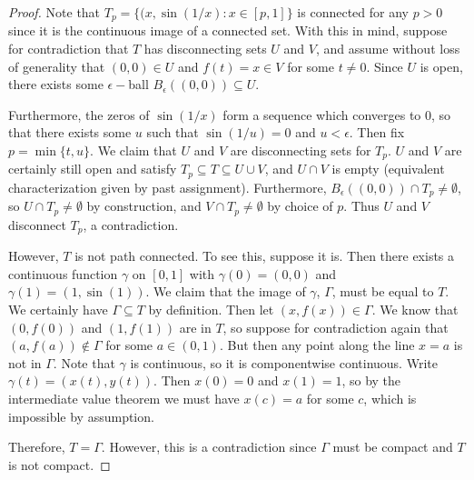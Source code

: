 \documentclass[11pt, a4paper]{memoir}
\theoremstyle{change}
\theoremstyle{plain}
\theoremstyle{nonumberplain}
\newtheorem{proof}{Proof}
\numberwithin{equation}{section}
\begin{document}
\begin{proof}
    Note that $T_p=\{(x,\sin(1/x):x\in[p,1]\}$ is connected for any $p>0$ since it is the continuous image
    of a connected set. With this in mind, suppose for contradiction that $T$ has disconnecting sets
    $U$ and $V$, and assume without loss of generality that $(0,0)\in U$ and $f(t)=x\in V$ for some $t\neq 0$.
    Since $U$ is open, there exists some $\epsilon-$ball $B_\epsilon\left( (0,0) \right)\subseteq U$.

    Furthermore, the zeros of $\sin(1/x)$ form a sequence which converges to 0, so that there exists some
    $u$ such that $\sin(1/u)=0$ and $u<\epsilon$. Then fix $p=\min\{t,u\}$. We claim that $U$ and $V$ are
    disconnecting sets for $T_p$. $U$ and $V$ are certainly still
    open and satisfy $T_p\subseteq T\subseteq U\cup V$, and $U\cap V$ is empty (equivalent characterization
    given by past assignment). Furthermore, $B_\epsilon\left( (0,0) \right)\cap T_p\neq\emptyset$,
    so $U\cap T_p\neq\emptyset$ by construction, and $V\cap T_p\neq\emptyset$ by choice of $p$. Thus $U$ and
    $V$ disconnect $T_p$, a contradiction.

    However, $T$ is not path connected. To see this, suppose it is. Then there exists a continuous function
    $\gamma$ on $[0,1]$ with $\gamma(0)=(0,0)$ and $\gamma(1)=(1,\sin(1))$. We claim that the image
    of $\gamma$, $\Gamma$, must be equal to $T$. We certainly have $\Gamma\subseteq T$ by definition. Then
    let $(x,f(x))\in\Gamma$. We know that $(0,f(0))$ and $(1,f(1))$ are in $T$, so suppose
    for contradiction again that $(a,f(a))\notin \Gamma$ for some $a\in(0,1)$. But then any point along the
    line $x=a$ is not in $\Gamma$. Note that $\gamma$ is continuous, so it is componentwise continuous. Write
    $\gamma(t) = (x(t),y(t))$. Then $x(0)=0$ and $x(1)=1$, so by the intermediate value theorem we must have
    $x(c)=a$ for some $c$, which is impossible by assumption.

    Therefore, $T=\Gamma$. However, this is a contradiction since $\Gamma$ must be compact and $T$ is not compact.
\end{proof}
\end{document}
